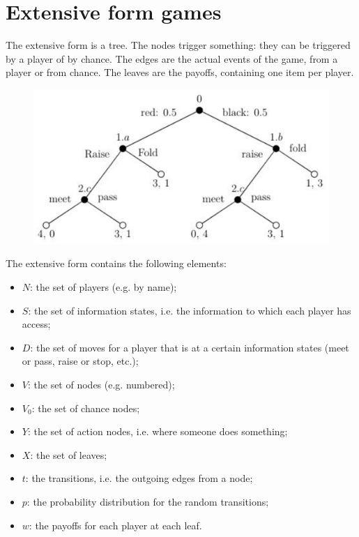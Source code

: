 \documentclass[12pt, openany]{report}
\theoremstyle{definition}
\begin{document}
\section{Extensive form games}
The extensive form is a tree. The nodes trigger something: they can be triggered by a player of by chance. The edges are the actual events of the game, from a player or from chance. The leaves are the payoffs, containing one item per player. 
\begin{figure}[H]
  \centering 
  \includegraphics[scale=.15]{img/extensive.png}
\end{figure}
The extensive form contains the following elements:
\begin{itemize}
	\item $N$: the set of players (e.g. by name);
	\item $S$: the set of information states, i.e. the information to which each player has access;
	\item $D$: the set of moves for a player that is at a certain information states (meet or pass, raise or stop, etc.);
	\item $V$: the set of nodes (e.g. numbered);
	\item $V_0$: the set of chance nodes;
	\item $Y$: the set of action nodes, i.e. where someone does something;
	\item $X$: the set of leaves;
	\item $t$: the transitions, i.e. the outgoing edges from a node;
	\item $p$: the probability distribution for the random transitions;
	\item $w$: the payoffs for each player at each leaf.
\end{itemize}
\end{document}
